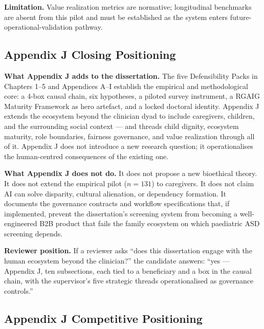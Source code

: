 \noindent\textbf{Limitation.} Value realization metrics are normative; longitudinal benchmarks are absent from this pilot and must be established as the system enters future-operational-validation pathway.

\subsection*{Appendix J Closing Positioning}

\noindent\textbf{What Appendix J adds to the dissertation.} The five Defensibility Packs in Chapters 1--5 and Appendices A--I establish the empirical and methodological core: a 4-box causal chain, six hypotheses, a piloted survey instrument, a RGAIG Maturity Framework as hero artefact, and a locked doctoral identity. Appendix J extends the ecosystem beyond the clinician dyad to include caregivers, children, and the surrounding social context --- and threads child dignity, ecosystem maturity, role boundaries, fairness governance, and value realization through all of it. Appendix J does not introduce a new research question; it operationalises the human-centred consequences of the existing one.

\noindent\textbf{What Appendix J does not do.} It does not propose a new bioethical theory. It does not extend the empirical pilot ($n=131$) to caregivers. It does not claim AI can solve disparity, cultural alienation, or dependency formation. It documents the governance contracts and workflow specifications that, if implemented, prevent the dissertation's screening system from becoming a well-engineered B2B product that fails the family ecosystem on which paediatric ASD screening depends.

\noindent\textbf{Reviewer position.} If a reviewer asks ``does this dissertation engage with the human ecosystem beyond the clinician?'' the candidate answers: ``yes --- Appendix J, ten subsections, each tied to a beneficiary and a box in the causal chain, with the supervisor's five strategic threads operationalised as governance controls.''

\subsection*{Appendix J Competitive Positioning}

